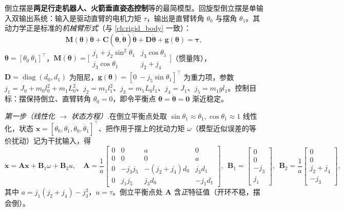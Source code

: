 \begin{example}
\label{ex:syn-pendulum}
倒立摆是\textbf{两足行走机器人、火箭垂直姿态控制}等的最简模型\cite{zhang2017modern}。回旋型倒立摆是单输入双输出系统：输入是驱动直臂的电机力矩 $\tau$，输出是直臂转角 $\theta_0$ 与摆角 $\theta_1$。其动力学正是标准的\emph{机械臂形式}（与 \cref{ch:rigid_body} 一致）：
\begin{equation}
  \mathbf M(\boldsymbol\theta)\ddot{\boldsymbol\theta}+\mathbf C(\boldsymbol\theta,\dot{\boldsymbol\theta})\dot{\boldsymbol\theta}+\mathbf D\dot{\boldsymbol\theta}+\mathbf g(\boldsymbol\theta)=\boldsymbol\tau,
  \label{eq:syn-pendulum-dyn}
\end{equation}
$\boldsymbol\theta=[\theta_0\ \theta_1]^\top$，$\mathbf M(\boldsymbol\theta)=\big[\begin{smallmatrix}j_1+j_2\sin^2\theta_1&j_3\cos\theta_1\\j_3\cos\theta_1&j_2+j_4\end{smallmatrix}\big]$（惯量阵），$\mathbf D=\operatorname{diag}(d_0,d_1)$ 为阻尼，$\mathbf g(\boldsymbol\theta)=[0\ -j_5\sin\theta_1]^\top$ 为重力项，参数 $j_1=J_0+m_0l_0^2+m_1L_0^2$、$j_2=m_1l_1^2$、$j_3=m_1L_0l_1$、$j_4=J_1$、$j_5=m_1gl_1$。控制目标：摆保持倒立、直臂转角 $\theta_0=0$，即令平衡点 $\boldsymbol\theta=\dot{\boldsymbol\theta}=\mathbf 0$ 渐近稳定。

\emph{第一步（线性化 $\to$ 状态方程）.}\;在倒立平衡点处取 $\sin\theta_1\approx\theta_1,\cos\theta_1\approx1$ 线性化，状态 $\mathbf x=[\theta_0,\theta_1,\dot\theta_0,\dot\theta_1]^\top$、把作用于摆上的扰动力矩 $\omega$（模型近似误差的等价扰动）记为干扰输入，得
\begin{equation}
  \dot{\mathbf x}=\mathbf A\mathbf x+\mathbf B_1\omega+\mathbf B_2 u,\quad
  \mathbf A=\frac1a\!\begin{bmatrix}0&0&a&0\\0&0&0&a\\0&-j_3j_5&-(j_2{+}j_4)d_0&j_3d_1\\0&j_1j_5&j_3d_0&-j_1d_1\end{bmatrix}\!,\ \
  \mathbf B_1=\!\begin{bmatrix}0\\0\\-j_3\\j_1\end{bmatrix}\!,\ \
  \mathbf B_2=\frac1a\!\begin{bmatrix}0\\0\\j_2{+}j_4\\-j_3\end{bmatrix}\!,
  \label{eq:syn-pendulum-ss}
\end{equation}
其中 $a=j_1(j_2+j_4)-j_3^2$，$u=\tau$。倒立平衡点处 $\mathbf A$ 含\emph{正}特征值（开环不稳，摆会倒）。


\end{example}
